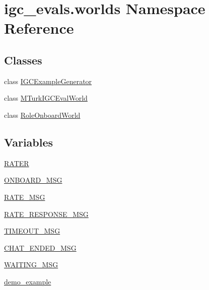 \hypertarget{namespaceigc__evals_1_1worlds}{}\section{igc\+\_\+evals.\+worlds Namespace Reference}
\label{namespaceigc__evals_1_1worlds}
\subsection*{Classes}
\begin{DoxyCompactItemize}
\item 
class \hyperlink{classigc__evals_1_1worlds_1_1IGCExampleGenerator}{I\+G\+C\+Example\+Generator}
\item 
class \hyperlink{classigc__evals_1_1worlds_1_1MTurkIGCEvalWorld}{M\+Turk\+I\+G\+C\+Eval\+World}
\item 
class \hyperlink{classigc__evals_1_1worlds_1_1RoleOnboardWorld}{Role\+Onboard\+World}
\end{DoxyCompactItemize}
\subsection*{Variables}
\begin{DoxyCompactItemize}
\item 
\hyperlink{namespaceigc__evals_1_1worlds_adac4acfdfebd3d6145b11920c55d5736}{R\+A\+T\+ER}
\item 
\hyperlink{namespaceigc__evals_1_1worlds_a5f7fdfa30f099482daaae0af6b2eb0cd}{O\+N\+B\+O\+A\+R\+D\+\_\+\+M\+SG}
\item 
\hyperlink{namespaceigc__evals_1_1worlds_ad4eca0139ad191904da35a50bc904f61}{R\+A\+T\+E\+\_\+\+M\+SG}
\item 
\hyperlink{namespaceigc__evals_1_1worlds_a7042e85ee64ea89a3fd78ab5bbc77425}{R\+A\+T\+E\+\_\+\+R\+E\+S\+P\+O\+N\+S\+E\+\_\+\+M\+SG}
\item 
\hyperlink{namespaceigc__evals_1_1worlds_a7925df3b835800215869b70a9ba0d394}{T\+I\+M\+E\+O\+U\+T\+\_\+\+M\+SG}
\item 
\hyperlink{namespaceigc__evals_1_1worlds_a29a6b70a8919616869d7b8b34bed2ff4}{C\+H\+A\+T\+\_\+\+E\+N\+D\+E\+D\+\_\+\+M\+SG}
\item 
\hyperlink{namespaceigc__evals_1_1worlds_a7fff9b8b889a00522ffb3b27d9e42178}{W\+A\+I\+T\+I\+N\+G\+\_\+\+M\+SG}
\item 
\hyperlink{namespaceigc__evals_1_1worlds_a7b4e1672652f62c1a77869ed666ca073}{demo\+\_\+example}
\end{DoxyCompactItemize}


